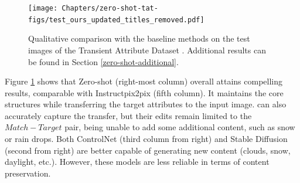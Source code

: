  \begin{figure}[ht]
  \texttt{[image: Chapters/zero-shot-tat-figs/test\_ours\_updated\_titles\_removed.pdf]}
  \caption{Qualitative comparison with the baseline methods on the test images of the Transient Attribute Dataset \cite{laffont2014transient}. Additional results can be found in Section \ref{zero-shot-additional}.}
  \label{fig:zero-shot-comparison}
\end{figure}

Figure \ref{fig:zero-shot-comparison} shows that Zero-shot (right-most column) overall attains compelling results, comparable with Instructpix2pix (fifth column). It maintains the core structures while transferring the target attributes to the input image. \citeauthor{laffont2014transient} \cite{laffont2014transient} can also accurately capture the transfer, but their edits remain limited to the $Match - Target$ pair, being unable to add some additional content, such as snow or rain drops. Both ControlNet (third column from right) and Stable Diffusion (second from right) are better capable of generating new content (clouds, snow, daylight, etc.). However, these models are less reliable in terms of content preservation. 

